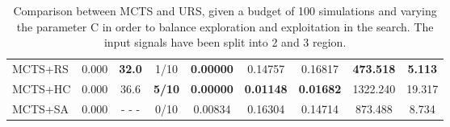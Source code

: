 \documentclass[11pt]{article}
\begin{document}
\begin{table}[ht]
\begin{tabular}{|l|l|c|c|c|c|c|c|c|}
MCTS+RS                                     & 0.000              &  \textbf{32.0}          & 1/10                          & \textbf{0.00000}  & 0.14757  & 0.16817  &  \textbf{473.518}   &  \textbf{5.113}       \\
MCTS+HC                                     & 0.000              &  36.6                   & \textbf{5/10}                 & \textbf{0.00000}  & \textbf{0.01148}  & \textbf{0.01682}  & 1322.240   & 19.317       \\
MCTS+SA                                     & 0.000              & - - -                   & 0/10                          & 0.00834  & 0.16304  & 0.14714  &  873.488   &  8.734       \\ \hline
\end{tabular}
\caption{Comparison between MCTS and URS, given a budget of 100 simulations and varying the parameter C in order to balance exploration and exploitation in the search. The input signals have been split into 2 and 3 region.}~\label{table:res:s2}
\end{table}
\end{document}
